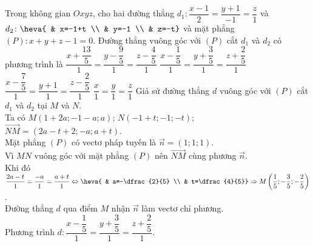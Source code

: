 \begin{ex}%
Trong không gian $Oxyz$, cho hai đường thẳng $d_1\colon \dfrac{x-1}{2}=\dfrac{y+1}{-1}=\dfrac{z}{1}$ và $d_2\colon \heva{ & x=-1+t \\ & y=-1 \\ & z=-t}$ và mặt phẳng $(P)\colon x+y+z-1=0$. Đường thẳng vuông góc với $(P)$ cắt $d_1$ và $d_2$ có phương trình là
\choice
{$\dfrac{x+\dfrac{13}{5}}{1}=\dfrac{y-\dfrac{9}{5}}{1}=\dfrac{z-\dfrac{4}{5}}{1}$}
{\True $\dfrac{x-\dfrac{1}{5}}{1}=\dfrac{y+\dfrac{3}{5}}{1}=\dfrac{z+\dfrac{2}{5}}{1}$}
{$\dfrac{x-\dfrac{7}{5}}{1}=\dfrac{y+1}{1}=\dfrac{z-\dfrac{2}{5}}{1}$}
{$\dfrac{x}{1}=\dfrac{y}{1}=\dfrac{z}{1}$}
\loigiai
{
Giả sử đường thẳng $d$ vuông góc với $(P)$ cắt $d_1$ và $d_2$ tại $M$ và $N$.\\
Ta có $M(1+2a;-1-a;a)$; $N(-1+t;-1;-t)$; $\overrightarrow{NM}=(2a-t+2;-a;a+t)$.\\
Mặt phẳng $(P)$ có vectơ pháp tuyến là $\overrightarrow{n}=(1;1;1)$.\\
Vì $MN$ vuông góc với mặt phẳng $(P)$ nên $\overrightarrow{NM}$ cùng phương $\overrightarrow{n}$.\\
Khi đó $\dfrac{2a-t}{1}=\dfrac{-a}{1}=\dfrac{a+t}{1} \Leftrightarrow \heva{ & a=-\dfrac{2}{5} \\ & t=\dfrac{4}{5}} \Rightarrow M\left(\dfrac{1}{5};-\dfrac{3}{5};-\dfrac{2}{5}\right)$.\\
Đường thẳng $d$ qua điểm $M$ nhận $\overrightarrow{n}$ làm vectơ chỉ phương.\\
Phương trình $d\colon \dfrac{x-\dfrac{1}{5}}{1}=\dfrac{y+\dfrac{3}{5}}{1}=\dfrac{z+\dfrac{2}{5}}{1}$.
}
\end{ex}

